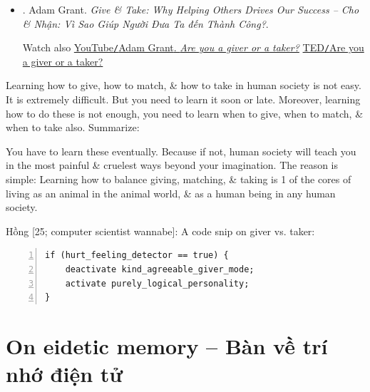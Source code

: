 \documentclass[12pt,oneside]{book}
\begin{document}
\begin{itemize}
\begin{itemize}
		{\sf[en]$\to$[vi]} Nghiên cứu chứng minh rằng những người cho đi sẽ chìm xuống đáy của bậc thang thành công. Trong nhiều ngành nghề quan trọng, người cho đi gặp bất lợi: họ làm cho người khác được lợi hơn nhưng lại hy sinh thành công của chính mình trong quá trình này.
		
		\item {\it``Meyer summarizes his code of honor as ``(1) Show up. (2) Work hard. (3) Be kind. (4) Take the high road.''''}
		
		{\sf[en]$\to$[vi]} Meyer tóm tắt quy tắc danh dự của mình là ``(1) Xuất hiện. (2) Làm việc chăm chỉ. (3) Hãy tử tế. (4) Đi đường cao tốc.
	\end{itemize}
	Với bản dịch tiếng Việt:
	\item \cite{Grant_give_take_VN}. {\sc Adam Grant}. {\it Give \& Take: Why Helping Others Drives Our Success -- Cho \& Nhận: Vì Sao Giúp Người Đưa Ta đến Thành Công?}.
	
	Watch also \href{https://www.youtube.com/watch?v=YyXRYgjQXX0}{YouTube{\tt/}{\sc Adam Grant}. {\it Are you a giver or a taker?}} \href{https://www.ted.com/talks/adam_grant_are_you_a_giver_or_a_taker}{TED{\tt/}Are you a giver or a taker?}
\end{itemize}
Learning how to give, how to match, \& how to take in human society is not easy. It is extremely difficult. But you need to learn it soon or late. Moreover, learning how to do these is not enough, you need to learn when to give, when to match, \& when to take also. Summarize:
\begin{center}
\end{center}
You have to learn these eventually. Because if not, human society will teach you in the most painful \& cruelest ways beyond your imagination. The reason is simple: Learning how to balance giving, matching, \& taking is 1 of the cores of living as an animal in the animal world, \& as a human being in any human society.

{\sf Hồng [25; computer scientist wannabe]}: A code snip on giver vs. taker:
\begin{Verbatim}[numbers=left,xleftmargin=5mm]
if (hurt_feeling_detector == true) {
    deactivate kind_agreeable_giver_mode;
    activate purely_logical_personality;
}
\end{Verbatim}

\section{On eidetic memory -- Bàn về trí nhớ điện tử}
\label{sect: eidetic memory}
\end{document}
